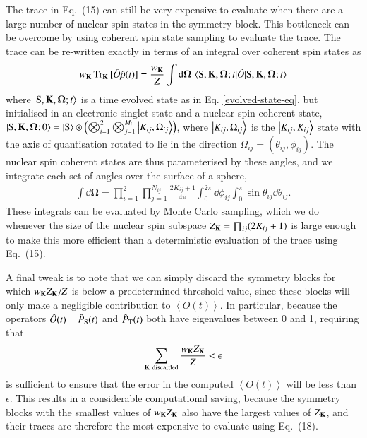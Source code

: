 \documentclass[%
aip,
jcp,%
amsmath,amssymb,
reprint%
]{revtex4-1}
\newcommand{\sing}{\ensuremath{\mathrm{S}}}
\renewcommand{\op}[1]{\ensuremath{\hat{#1}}}
\begin{document}
The trace in Eq.~(15) can still be very expensive to evaluate when there are a large number of nuclear spin states in the symmetry block. This bottleneck can be overcome by using coherent spin state sampling to evaluate the trace.\cite{Lewis2016} The trace can be re-written exactly in terms of an integral over coherent spin states as\cite{Radcliffe1971,Arecchi1972}
\begin{align}
  w_{\vb{K}}\Tr_{\vb{K}} {[\op{O}\op{\rho}(t)]} = \frac{w_{\vb{K}}}{Z}\int\dd{\boldsymbol{\Omega}}\ev{\op{O}}{\sing,\vb{K},\boldsymbol{\Omega};t}
\end{align}
where $\ket{\sing,\vb{K},\boldsymbol{\Omega};t}$ is a time evolved state as in Eq. \eqref{evolved-state-eq}, but initialised in an electronic singlet state and a nuclear spin coherent state, $\ket{\sing,\vb{K},\boldsymbol{\Omega};0}=\ket{\sing}\otimes\left(\bigotimes_{i=1}^2\bigotimes_{j=1}^{M_i}\ket{K_{ij},\Omega_{ij}}\right)$,\cite{Lewis2016,Fay2017} where $\ket{K_{ij},\Omega_{ij}}$ is the $\ket{K_{ij},K_{ij}}$ state with the axis of quantisation rotated to lie in the direction $\Omega_{ij}=(\theta_{ij},\phi_{ij})$.\cite{Radcliffe1971,Arecchi1972} The nuclear spin coherent states are thus parameterised by these angles, and we integrate each set of angles over the surface of a sphere,\cite{Radcliffe1971,Arecchi1972}
\begin{align}
  \int\dd{\boldsymbol{\Omega}} = \prod_{i=1}^2\prod_{j=1}^{N_{ij}} \frac{2K_{ij}+1}{4\pi}\int_0^{2\pi}\dd{\phi_{ij}}\int_{0}^{\pi}\sin{\theta_{ij}}\dd{\theta_{ij}}.
\end{align}
These integrals can be evaluated by Monte Carlo sampling,\cite{Lewis2016} which we do whenever the size of the nuclear spin subspace $Z_{\vb{K}} = \prod_{ij}(2K_{ij}+1)$ is large enough to make this more efficient than a deterministic evaluation of the trace using Eq.~(15). 

A final tweak is to note that we can simply discard the symmetry blocks for which $w_{\vb{K}}Z_{\vb{K}}/Z$ is below a predetermined threshold value, since these blocks will only make a negligible contribution to $\left<O(t)\right>$. In particular, because the operators $\hat{O}(t)=\hat{P}_{\rm S}(t)$ and $\hat{P}_{\rm T}(t)$ both have eigenvalues between 0 and 1, requiring that
\begin{align}
\sum_{{\bf K}\ {\rm discarded}} {w_{\bf K}Z_{\bf K}\over Z} < \epsilon
\end{align} 
is sufficient to ensure that the error in the computed $\left<O(t)\right>$ will be less than $\epsilon$. This results in a considerable computational saving, because the symmetry blocks with the smallest values of $w_{\bf K}Z_{\bf K}$ also have the largest values of $Z_{\bf K}$, and their traces are therefore the most expensive to evaluate using Eq.~(18).
\end{document}
